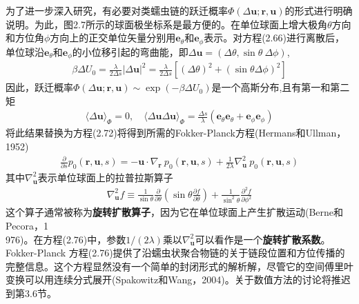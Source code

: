 \documentclass[12pt]{article}
\begin{document}
\begin{CJK}{UTF8}{gkai}
为了进一步深入研究，有必要对类蠕虫链的跃迁概率$\Phi(\Delta \textbf{u};\textbf{r},\textbf{u})$的形式进行明确说明。为此，图2.7所示的球面极坐标系是最方便的。在单位球面上增大极角$\theta$方向和方位角$\phi$方向上的正交单位矢量分别用$\textbf{e}_\theta$和$\textbf{e}_\phi$表示。对方程(2.66)进行离散后，单位球沿$\textbf{e}_\theta$和$\textbf{e}_\phi$的小位移引起的弯曲能，即$\Delta \textbf{u}=(\Delta \theta ,\sin \theta \ \Delta \phi)$,\\
\begin{gather}
\beta\Delta U_0 =\frac{\lambda}{2\Delta s}|\Delta \textbf{u}|^2 =\frac{\lambda}{2\Delta s}[(\Delta\theta)^2+(\sin \theta \Delta \phi)^2]
\end{gather}
因此，跃迁概率$\Phi(\Delta \textbf{u};\textbf{r},\textbf{u})\sim 
\exp(-\beta \Delta U_0)$是一个高斯分布,且有第一和第二矩\\
\begin{gather}
\langle \Delta \textbf{u}\rangle_\Phi =0,\quad \langle \Delta \textbf{u}\Delta \textbf{u}\rangle_\Phi =\frac{\Delta s}{\lambda}(\textbf{e}_\theta \textbf{e}_\theta+\textbf{e}_\phi \textbf{e}_\phi)
\end{gather}
将此结果替换为方程(2.72)将得到所需的Fokker-Planck方程(Hermans和Ullman，1952)\\
\begin{gather}
\frac{\partial}{\partial s}p_0(\textbf{r},\textbf{u},s) =-\textbf{u} \cdot \nabla_\textbf{r} \ p_0(\textbf{r},\textbf{u},s)+\frac{1}{2\lambda}\nabla_\textbf{u}^2\  p_0(\textbf{r},\textbf{u},s)
\end{gather}
其中$\nabla_\textbf{u}^2$表示单位球面上的拉普拉斯算子\\
\begin{gather}
\nabla_\textbf{u}^2 f \equiv \frac{1}{\sin\theta}\frac{\partial}{\partial\theta}\left(\sin\theta \frac{\partial f}{\partial \theta}\right)+\frac{1}{\sin^2\theta}\frac{\partial^2f}{\partial\phi^2}
\end{gather}
这个算子通常被称为\textbf{旋转扩散算子}，因为它在单位球面上产生扩散运动(Berne和Pecora，1\\976)。在方程(2.76)中，参数$1/(2\lambda)$乘以$\nabla_\textbf{u}^2$可以看作是一个\textbf{旋转扩散系数}。\\

Fokker-Planck 方程(2.76)提供了沿蠕虫状聚合物链的关于链段位置和方位传播的完整信息。这个方程显然没有一个简单的封闭形式的解析解，尽管它的空间傅里叶变换可以用连续分式展开(Spakowitz和Wang，2004)。关于数值方法的讨论将推迟到第3.6节。\\


\end{CJK}
\end{document}
